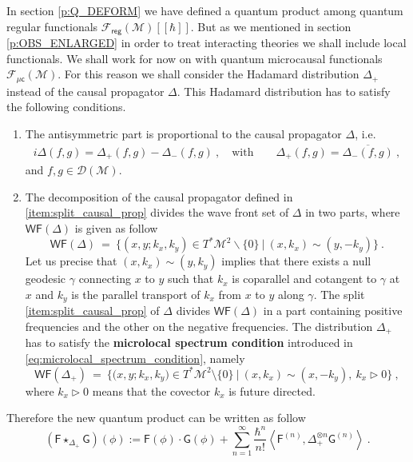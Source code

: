 \documentclass[11pt]{book}
\newcommand{\WF}{\mathsf{WF}}
\newcommand{\reg}{\mathsf{reg}}
\newcommand{\sm}[1]{\left\langle#1\right\rangle}
\newcommand{\Dcal}{\mathcal{D}}
\newcommand{\Fcal}{\mathcal{F}}
\newcommand{\Mcal}{\mathcal{M}}
\newcommand{\Fsf}{\mathsf{F}}
\newcommand{\Gsf}{\mathsf{G}}
\theoremstyle{break}
\begin{document}
In section \ref{p:Q_DEFORM} we have defined a quantum product among quantum regular functionals $\Fcal_\reg(\Mcal)[[\hbar]]$. But as we mentioned in section \ref{p:OBS_ENLARGED} in order to treat interacting theories we shall include local functionals. We shall work for now on with quantum microcausal functionals $\Fcal_{\mathsf{\mu c}}(\Mcal)$. For this reason we shall consider the Hadamard distribution $\Delta_+$ instead of the causal propagator $\Delta$. This Hadamard distribution has to satisfy the following conditions.
%
\begin{enumerate}
\item\label{item:split_causal_prop} The antisymmetric part is proportional to the causal propagator $\Delta$, i.e. 
%
\begin{eqnarray*}
i \Delta(f,g) = \Delta_+(f,g) - \Delta_-(f,g) \ , \quad \mbox{with} \qquad \Delta_+(f,g) = \overline{\Delta_-(f,g)} \ ,
\end{eqnarray*}
%
and $f,g \in \Dcal(\Mcal)$.

\item The decomposition of the causal propagator defined in \ref{item:split_causal_prop} divides the wave front set of $\Delta$ in two parts, where $\WF(\Delta)$ is given as follow
%
\begin{equation}
\WF(\Delta) \ = \ \bigg\{ \left(x,y;k_x,k_y\right) \in T^{\ast}\Mcal^{2} \backslash\{0\} \ \bigg| \ (x,k_x) \sim (y,-k_y) \bigg\} \ .
\label{eq:wf_causal_prop}
\end{equation}
%
Let us precise that $(x,k_x) \sim (y,k_y)$ implies that there exists a null geodesic $\gamma$ connecting $x$ to $y$ such that $k_x$ is coparallel and cotangent to $\gamma$ at $x$ and $k_y$ is the parallel transport of $k_x$ from $x$ to $y$ along $\gamma$. The split \ref{item:split_causal_prop} of $\Delta$ divides $\WF(\Delta)$ in a part containing positive frequencies and the other on the negative frequencies. The distribution $\Delta_+$ has to satisfy the \textbf{microlocal spectrum condition} introduced in \eqref{eq:microlocal_spectrum_condition}, namely
%
\begin{equation}
\WF(\Delta_+) \ = \ \bigg\{ \bigg( x, y ; k_x, k_y \bigg) \in T^\ast\Mcal^2 \setminus \{0\} \ \bigg| \ (x,k_x) \sim (x,-k_y), \ k_x \triangleright 0 \bigg\} \ ,
\label{eq:wf_hadamard}
\end{equation}
%
where $k_x \triangleright 0$ means that the covector $k_x$ is future directed. 
\end{enumerate}


Therefore the new quantum product can be written as follow 
%
\begin{equation}
(\Fsf \star_{\Delta_+} \Gsf)(\phi) := \Fsf(\phi) \cdot \Gsf(\phi) + \sum_{n=1}^\infty \frac{\hbar^n}{n!} \sm{ \Fsf^{(n)} , \Delta_+^{\otimes n} \Gsf^{(n) } } \ .
\label{eq:q_prod_loc}
\end{equation}
\end{document}
